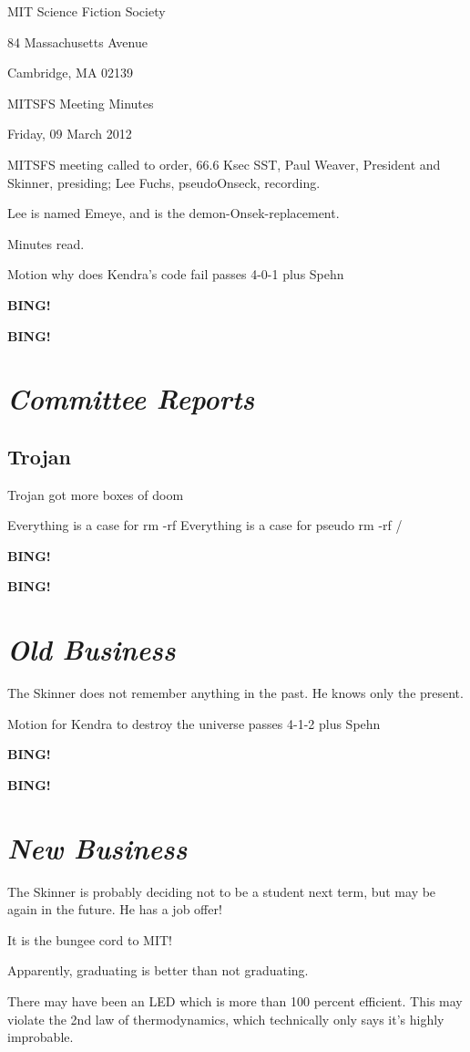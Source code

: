 \documentclass[10pt]{article}
\newcommand{\bing}{{\bf BING!} }
\newcommand{\goto}[1]{\bing \vskip 12pt \section*{{\em{#1}}}}
\newcommand{\ps}{ plus Spehn\xspace}
\newcommand{\skinner}{Paul Weaver, President and Skinner}
\newcommand{\onseck}{Lee Fuchs, pseudoOnseck}
\newcommand{\meetingdate}{Friday, 09 March 2012}
\begin{document}
\begin{center}

MIT Science Fiction Society

84 Massachusetts Avenue

Cambridge, MA 02139

\vspace{12pt}

MITSFS Meeting Minutes

\meetingdate

\end{center}

\vspace{18pt}

\setlength{\parskip}{6pt}

\noindent
MITSFS meeting called to order, 66.6 Ksec SST,
\skinner, presiding; \onseck, recording.

Lee is named Emeye, and is the demon-Onsek-replacement.

Minutes read.

Motion why does Kendra's code fail passes 4-0-1 \ps

\bing

\goto{Committee Reports}

\subsection*{Trojan}

Trojan got more boxes of doom



Everything is a case for rm -rf
Everything is a case for pseudo rm -rf /

\bing

\goto{Old Business}

The Skinner does not remember anything in the past. He knows only the present.

Motion for Kendra to destroy the universe passes 4-1-2 \ps

\bing

\goto{New Business}

The Skinner is probably deciding not to be a student next term, but may be again in the future. He has a job offer!

It is the bungee cord to MIT!

Apparently, graduating is better than not graduating.

There may have been an LED which is more than 100 percent efficient. This may violate the 2nd law of thermodynamics, which technically only says it's highly improbable.
\end{document}
